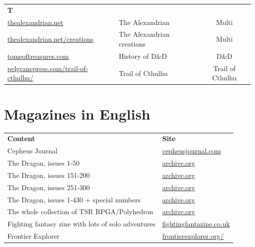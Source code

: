 \documentclass[a4paper, 11pt, twoside]{article}
\begin{document}
\begin{longtable}{llc}
\textbf{T} &  & \\
\href{http://thealexandrian.net/index.html}{thealexandrian.net} & The Alexandrian & Multi\\
\href{http://www.thealexandrian.net/creations/creations.html}{thealexandrian.net/creations} & The Alexandrian creations & Multi\\
\href{http://www.tomeoftreasures.com/tot\_adnd/adnd\_history.htm}{tomeoftreasures.com} & History of D\&D & D\&D\\
\href{http://site.pelgranepress.com/index.php/category/products/trail-of-cthulhu/}{pelgranepress.com/trail-of-cthulhu/} & Trail of Cthulhu & Trail of Cthulhu\\
\end{longtable}

\section{Magazines in English}
\label{sec:org9b2417a}

\begin{longtable}{ll}
\textbf{Content} & \textbf{Site}\\
Cepheus Journal & \href{https://cepheusjournal.com/}{cepheusjournal.com}\\
The Dragon, issues 1-50 & \href{https://archive.org/details/DragonMagazine045\_201903}{archive.org}\\
The Dragon, issues 151-200 & \href{https://archive.org/details/DragonMagazine200\_201903/dragon\%2520151-200/Dragon\%2520Magazine\%2520\%2523151/page/n0/mode/2up}{archive.org}\\
The Dragon, issues 251-300 & \href{https://archive.org/details/DragonMagazine200\_201903/dragon\%2520151-200/Dragon\%2520Magazine\%2520\%2523151/page/n0/mode/2up}{archive.org}\\
The Dragon, issues 1-430 + special numbers & \href{https://archive.org/details/DragonMagazine260\_201801/Dragon\%2520Magazine\%2520430/mode/2up}{archive.org}\\
The whole collection of TSR RPGA/Polyhedron & \href{https://archive.org/details/Polyhedron105}{archive.org}\\
Fighting fantasy zine with lots of solo adventures & \href{http://www.fightingfantazine.co.uk/page/}{fightingfantazine.co.uk}\\
Frontier Explorer & \href{https://frontierexplorer.org/}{frontierexplorer.org/}\\
\end{longtable}
\end{document}
